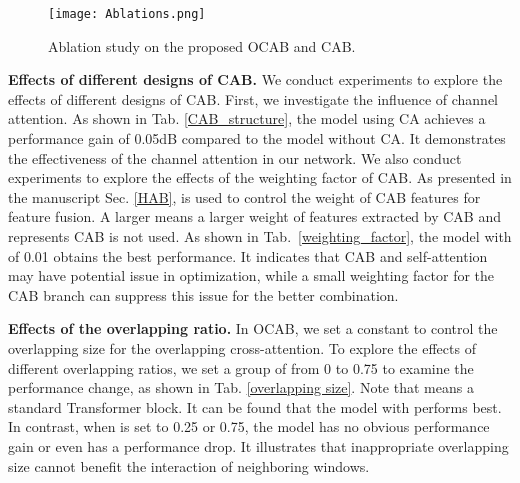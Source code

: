 \documentclass[10pt,twocolumn,letterpaper]{article}
\begin{document}
\begin{table}[!t]
\center
\begin{center}
\caption{Ablation study on the proposed OCAB and CAB.}
\vspace{-0.2cm}
\label{ablation_study_tab}
\end{center}
\vspace{-0.3cm}
\end{table}

\begin{figure}[!t]
\centering
\texttt{[image: Ablations.png]}
\vspace{-0.7cm}
\caption{Ablation study on the proposed OCAB and CAB. 
}
\label{ablation_study_fig}
\vspace{-0.7cm}
\end{figure}

\noindent
\textbf{Effects of different designs of CAB.} 
We conduct experiments to explore the effects of different designs of CAB. First, we investigate the influence of channel attention. As shown in Tab. \ref{CAB_structure}, the model using CA achieves a performance gain of 0.05dB compared to the model without CA. It demonstrates the effectiveness of the channel attention in our network. 
We also conduct experiments to explore the effects of the weighting factor  of CAB. As presented in the manuscript Sec. \ref{HAB},  is used to control the weight of CAB features for feature fusion. A larger  means a larger weight of features extracted by CAB and  represents CAB is not used. As shown in Tab.~\ref{weighting_factor}, the model with  of 0.01 obtains the best performance. It indicates that CAB and self-attention may have potential issue in optimization, while a small weighting factor for the CAB branch can suppress this issue for the better combination.

\noindent
\textbf{Effects of the overlapping ratio.}
In OCAB, we set a constant  to control the overlapping size for the overlapping cross-attention. To explore the effects of different overlapping ratios, we set a group of  from 0 to 0.75 to examine the performance change, as shown in Tab. \ref{overlapping size}. Note that  means a standard Transformer block. It can be found that the model with  performs best. In contrast, when  is set to 0.25 or 0.75, the model has no obvious performance gain or even has a performance drop. It illustrates that inappropriate overlapping size cannot benefit the interaction of neighboring windows. 
\end{document}
